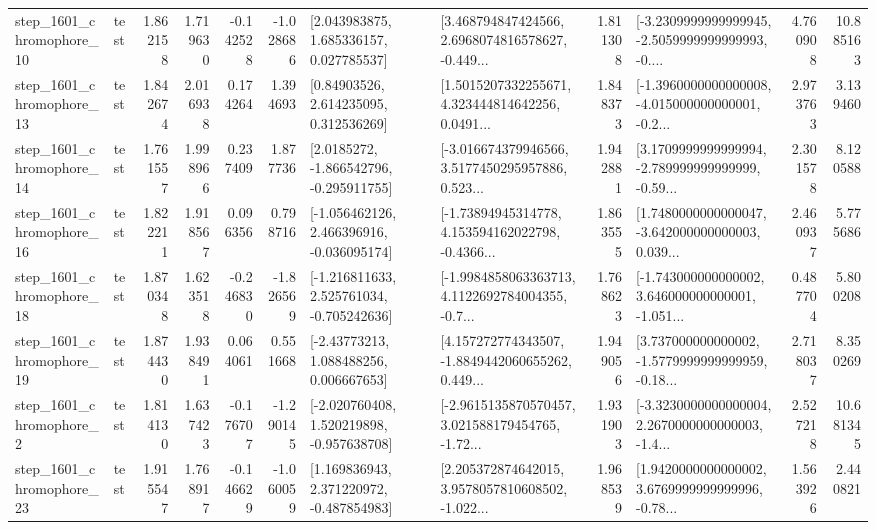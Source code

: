 \begin{tabular}{llrrrrllrlrr}
 step\_1601\_chromophore\_10 &      test &      1.862158 &    1.719630 &     -0.142528 & -1.028686 &     [2.043983875, 1.685336157, 0.027785537] &  [3.468794847424566, 2.6968074816578627, -0.449... &       1.811308 &  [-3.2309999999999945, -2.5059999999999993, -0.... &            4.760908 &         10.885163 \\
 step\_1601\_chromophore\_13 &      test &      1.842674 &    2.016938 &      0.174264 &  1.394693 &      [0.84903526, 2.614235095, 0.312536269] &  [1.5015207332255671, 4.323444814642256, 0.0491... &       1.848373 &  [-1.3960000000000008, -4.015000000000001, -0.2... &            2.973763 &          3.139460 \\
 step\_1601\_chromophore\_14 &      test &      1.761557 &    1.998966 &      0.237409 &  1.877736 &     [2.0185272, -1.866542796, -0.295911755] &  [-3.016674379946566, 3.5177450295957886, 0.523... &       1.942881 &  [3.1709999999999994, -2.789999999999999, -0.59... &            2.301578 &          8.120588 \\
 step\_1601\_chromophore\_16 &      test &      1.822211 &    1.918567 &      0.096356 &  0.798716 &   [-1.056462126, 2.466396916, -0.036095174] &  [-1.73894945314778, 4.153594162022798, -0.4366... &       1.863555 &  [1.7480000000000047, -3.642000000000003, 0.039... &            2.460937 &          5.775686 \\
 step\_1601\_chromophore\_18 &      test &      1.870348 &    1.623518 &     -0.246830 & -1.826569 &   [-1.216811633, 2.525761034, -0.705242636] &  [-1.9984858063363713, 4.1122692784004355, -0.7... &       1.768623 &  [-1.743000000000002, 3.646000000000001, -1.051... &            0.487704 &          5.800208 \\
 step\_1601\_chromophore\_19 &      test &      1.874430 &    1.938491 &      0.064061 &  0.551668 &     [-2.43773213, 1.088488256, 0.006667653] &  [4.157272774343507, -1.8849442060655262, 0.449... &       1.949056 &  [3.737000000000002, -1.5779999999999959, -0.18... &            2.718037 &          8.350269 \\
  step\_1601\_chromophore\_2 &      test &      1.814130 &    1.637423 &     -0.176707 & -1.290145 &   [-2.020760408, 1.520219898, -0.957638708] &  [-2.9615135870570457, 3.021588179454765, -1.72... &       1.931903 &  [-3.3230000000000004, 2.2670000000000003, -1.4... &            2.527218 &         10.681345 \\
 step\_1601\_chromophore\_23 &      test &      1.915547 &    1.768917 &     -0.146629 & -1.060059 &    [1.169836943, 2.371220972, -0.487854983] &  [2.205372874642015, 3.9578057810608502, -1.022... &       1.968539 &  [1.9420000000000002, 3.6769999999999996, -0.78... &            1.563926 &          2.440821 \\

\end{tabular}

